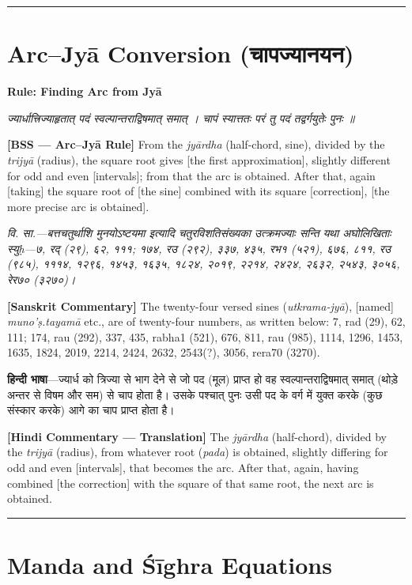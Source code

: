 \documentclass[11pt,a4paper]{book}
\newcommand{\dev}[1]{{\devanagarifont #1}}
\newcommand{\shlokabilingual}[2]{%
  \par\vspace{0.8em}%
  \noindent\begin{minipage}[t]{0.48\textwidth}
    \RaggedRight
    \dev{\textit{#1}}
  \end{minipage}%
  \hfill
  \begin{minipage}[t]{0.48\textwidth}
    \RaggedRight
    #2%
  \end{minipage}%
  \par\vspace{0.8em}%
}
\newcommand{\sktcommbilingual}[2]{%
  \par\vspace{0.5em}%
  \noindent\begin{minipage}[t]{0.48\textwidth}
    \RaggedRight\small\itshape
    \dev{#1}
  \end{minipage}%
  \hfill
  \begin{minipage}[t]{0.48\textwidth}
    \RaggedRight\small
    #2%
  \end{minipage}%
  \par\vspace{0.5em}%
}
\newcommand{\hindicommbilingual}[2]{%
  \par\vspace{0.5em}%
  \noindent\begin{minipage}[t]{0.48\textwidth}
    \RaggedRight\small
    \dev{#1}
  \end{minipage}%
  \hfill
  \begin{minipage}[t]{0.48\textwidth}
    \RaggedRight\small
    #2%
  \end{minipage}%
  \par\vspace{0.5em}%
}
\newcommand{\ruleheadingbilingual}[2]{%
  \par\vspace{0.8em}%
  \noindent\begin{minipage}[t]{0.48\textwidth}
    \textbf{\color{sectioncolor}\dev{#1}}
  \end{minipage}%
  \hfill
  \begin{minipage}[t]{0.48\textwidth}
    \textbf{\color{sectioncolor}#2}
  \end{minipage}%
  \par\vspace{0.4em}%
}
\newcommand{\secdivider}{%
  \begin{center}\rule{0.4\textwidth}{0.5pt}\end{center}%
}
\begin{document}
\secdivider
\clearpage

\section{Arc--Jyā Conversion (\dev{चापज्यानयन})}

\ruleheadingbilingual{नियमः चापनिर्माणम्‌}{Rule: Finding Arc from Jyā}

\shlokabilingual{%
ज्यार्धात्त्रिज्याहृतात्‌ पदं स्वल्पान्तराद्विषमात्‌ समात्‌ ।
चापं स्यात्ततः परं तु पदं तद्वर्गयुतेः पुनः ॥
}{%
\textbf{[BSS --- Arc--Jyā Rule]} From the \textit{jyārdha} (half-chord, sine), divided by the \textit{trijyā} (radius), the square root gives [the first approximation], slightly different for odd and even [intervals]; from that the arc is obtained. After that, again [taking] the square root of [the sine] combined with its square [correction], [the more precise arc is obtained].
}

\sktcommbilingual{%
\dev{वि. सा.}---बत्तचतुर्थाशि मुनयोऽष्टयमा इत्यादि चतुरविशतिसंख्यका उत्क्रमज्याः सन्ति यथा अघोलिखिताः स्युḥ---७, रद् (२९), ६२, १११; १७४, रउ (२९२), ३३७, ४३५, रभ१ (५२१), ६७६, ८११, रउ (९८५), १११४, १२९६, १४५३, १६३५, १८२४, २०१९, २२१४, २४२४, २६३२, २५४३, ३०५६, रेर७० (३२७०)।
}{%
\textbf{[Sanskrit Commentary]} The twenty-four versed sines (\textit{utkrama-jyā}), [named] \textit{muno'ṣ.tayamā} etc., are of twenty-four numbers, as written below: 7, rad (29), 62, 111; 174, rau (292), 337, 435, rabha1 (521), 676, 811, rau (985), 1114, 1296, 1453, 1635, 1824, 2019, 2214, 2424, 2632, 2543(?), 3056, rera70 (3270).
}

\hindicommbilingual{%
\textbf{हिन्दी भाषा}---ज्यार्ध को त्रिज्या से भाग देने से जो पद (मूल) प्राप्त हो वह स्वल्पान्तराद्विषमात्‌ समात्‌ (थोड़े अन्तर से विषम और सम) से चाप होता है। उसके पश्चात्‌ पुनः उसी पद के वर्ग में युक्त करके (कुछ संस्कार करके) आगे का चाप प्राप्त होता है।
}{%
\textbf{[Hindi Commentary --- Translation]} The \textit{jyārdha} (half-chord), divided by the \textit{trijyā} (radius), from whatever root (\textit{pada}) is obtained, slightly differing for odd and even [intervals], that becomes the arc. After that, again, having combined [the correction] with the square of that same root, the next arc is obtained.
}

\secdivider
\clearpage

\section{Manda and Śīghra Equations}
\end{document}
